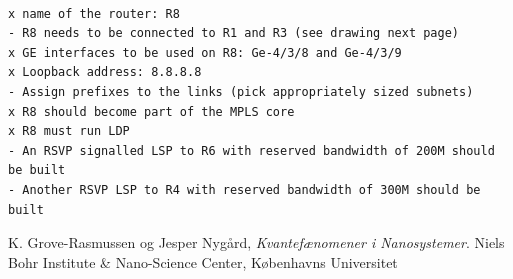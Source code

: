 \documentclass[a4paper]{article}
\begin{document}
\begin{verbatim}

x name of the router: R8
- R8 needs to be connected to R1 and R3 (see drawing next page)
x GE interfaces to be used on R8: Ge-4/3/8 and Ge-4/3/9
x Loopback address: 8.8.8.8
- Assign prefixes to the links (pick appropriately sized subnets)
x R8 should become part of the MPLS core
x R8 must run LDP
- An RSVP signalled LSP to R6 with reserved bandwidth of 200M should be built
- Another RSVP LSP to R4 with reserved bandwidth of 300M should be built

\end{verbatim}


\begin{thebibliography}{9}
  K. Grove-Rasmussen og Jesper Nygård,
  \emph{Kvantefænomener i Nanosystemer}.
  Niels Bohr Institute \& Nano-Science Center, Københavns Universitet

\end{thebibliography}
\end{document}
